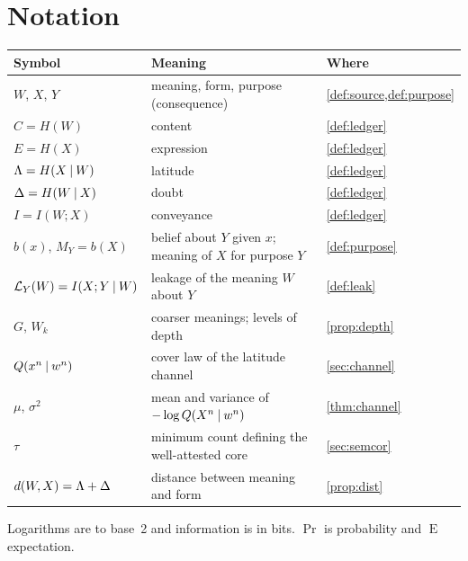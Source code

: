 \section{Notation}\label{app:notation}
\begin{center}\small
\begin{tabular}{@{}l p{7.4cm} l@{}}
\toprule
Symbol & Meaning & Where \\
\midrule
$W$, $X$, $Y$ & meaning, form, purpose (consequence) & \cref{def:source,def:purpose} \\
$C=H(W)$ & content & \cref{def:ledger} \\
$E=H(X)$ & expression & \cref{def:ledger} \\
$\Lambda=H(X\mathbin{\vert} W)$ & latitude & \cref{def:ledger} \\
$\Delta=H(W\mathbin{\vert} X)$ & doubt & \cref{def:ledger} \\
$I=I(W;X)$ & conveyance & \cref{def:ledger} \\
$b(x)$, $M_Y=b(X)$ & belief about $Y$ given $x$; meaning of $X$ for purpose $Y$ & \cref{def:purpose} \\
$\mathcal{L}_Y(W)=I(X;Y\mathbin{\vert} W)$ & leakage of the meaning $W$ about $Y$ & \cref{def:leak} \\
$G$, $W_k$ & coarser meanings; levels of depth & \cref{prop:depth} \\
$Q(x^n\mathbin{\vert} w^n)$ & cover law of the latitude channel & \cref{sec:channel} \\
$\mu$, $\sigma^2$ & mean and variance of $-\log Q(X^n\mathbin{\vert} w^n)$ & \cref{thm:channel} \\
$\tau$ & minimum count defining the well-attested core & \cref{sec:semcor} \\
$d(W,X)=\Lambda+\Delta$ & distance between meaning and form & \cref{prop:dist} \\
\bottomrule
\end{tabular}
\end{center}
Logarithms are to base~2 and information is in bits. $\Pr$ is probability and $\operatorname{E}$ expectation.
